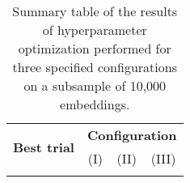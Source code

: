 \begin{longtable}[c]{|cl|ccc|}
    \caption{Summary table of the results of hyperparameter optimization performed for three specified configurations on a subsample of 10,000 embeddings.}
    \label{tab:experiment_results}\\
    \hline
    \multicolumn{2}{|c|}{\multirow{2}{*}{\textbf{Best trial}}} & \multicolumn{3}{c|}{\textbf{Configuration}}                                                \\ \cline{3-5}
    \multicolumn{2}{|c|}{}                                     & \multicolumn{1}{c|}{(I)} & \multicolumn{1}{c|}{(II)}    & (III) \\ \hline
    \endfirsthead

    \endhead

    \hline
    \endfoot

    \endlastfoot


\end{longtable}
